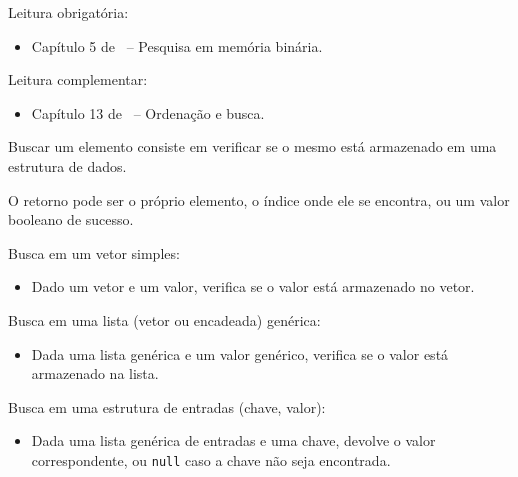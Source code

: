 \newcommand{\defs}{../defs}


\newcommand{\content}{Busca em estruturas lineares}
\newcommand{\class}{Algoritmos e Estruturas de Dados}
\newcommand{\shortcourse}{45EST}



\makeheader

{
Leitura obrigatória:
\begin{itemize}
	\item Capítulo 5 de~\cite{Ziviani2010} -- Pesquisa em memória binária.
\end{itemize}

Leitura complementar:
\begin{itemize}
	\item Capítulo 13 de~\cite{Pereira2008} -- Ordenação e busca.
\end{itemize}
}

\medskip


\begin{itemize}
	\item Buscar um elemento consiste em verificar se o mesmo está armazenado em uma estrutura de dados.
	\item O retorno pode ser o próprio elemento, o índice onde ele se encontra, ou um valor booleano de sucesso.

	{\color{redtext}
	\item Busca em um vetor simples:
	\begin{itemize}
		\item Dado um vetor e um valor, verifica se o valor está armazenado no vetor.
	\end{itemize}
	\item Busca em uma lista (vetor ou encadeada) genérica:
	\begin{itemize}
		\item Dada uma lista genérica e um valor genérico, verifica se o valor está armazenado na lista.
	\end{itemize}
	\item Busca em uma estrutura de entradas (chave, valor):
	\begin{itemize}
		\item Dada uma lista genérica de entradas e uma chave, devolve o valor correspondente, ou \texttt{null} caso a chave não seja encontrada.
	\end{itemize}
	}
\end{itemize}

